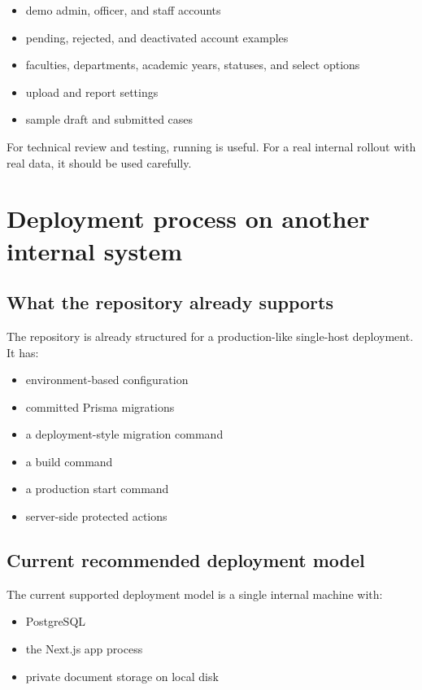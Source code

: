 \documentclass[11pt,a4paper]{article}
\newcommand{\code}[1]{{\small\path{#1}}}
\begin{document}
\begin{itemize}
  \item demo admin, officer, and staff accounts
  \item pending, rejected, and deactivated account examples
  \item faculties, departments, academic years, statuses, and select options
  \item upload and report settings
  \item sample draft and submitted cases
\end{itemize}

For technical review and testing, running \code{npm run seed} is useful. For a real internal rollout with real data, it should be used carefully.

\section{Deployment process on another internal system}
\subsection{What the repository already supports}
The repository is already structured for a production-like single-host deployment. It has:

\begin{itemize}
  \item environment-based configuration
  \item committed Prisma migrations
  \item a deployment-style migration command
  \item a build command
  \item a production start command
  \item server-side protected actions
\end{itemize}

\subsection{Current recommended deployment model}
The current supported deployment model is a single internal machine with:

\begin{itemize}
  \item PostgreSQL
  \item the Next.js app process
  \item private document storage on local disk
\end{itemize}
\end{document}
